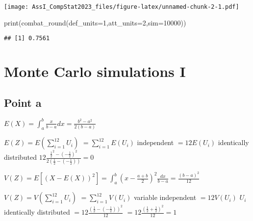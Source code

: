 \documentclass[
]{article}
\newenvironment{Shaded}{\begin{snugshade}}{\end{snugshade}}
\newcommand{\AttributeTok}[1]{\textcolor[rgb]{0.77,0.63,0.00}{#1}}
\newcommand{\DecValTok}[1]{\textcolor[rgb]{0.00,0.00,0.81}{#1}}
\newcommand{\FunctionTok}[1]{\textcolor[rgb]{0.00,0.00,0.00}{#1}}
\newcommand{\NormalTok}[1]{#1}
\begin{document}
\texttt{[image: AssI\_CompStat2023\_files/figure-latex/unnamed-chunk-2-1.pdf]}

\begin{Shaded}
\begin{Highlighting}[]
\FunctionTok{print}\NormalTok{(}\FunctionTok{combat\_round}\NormalTok{(}\AttributeTok{def\_units=}\DecValTok{1}\NormalTok{,}\AttributeTok{att\_units=}\DecValTok{2}\NormalTok{,}\AttributeTok{sim=}\DecValTok{10000}\NormalTok{))}
\end{Highlighting}
\end{Shaded}

\begin{verbatim}
## [1] 0.7561
\end{verbatim}

\hypertarget{monte-carlo-simulations-i}{%
\section{Monte Carlo simulations I}\label{monte-carlo-simulations-i}}

\hypertarget{point-a-1}{%
\subsection{Point a}\label{point-a-1}}

\(E(X)=\int_a^b\frac{x}{b-a}dx=\frac{b^2-a^2}{2(b-a)}\)

\(E(Z)=E(\sum_{i=1}^{12}U_i)\) \(=\sum_{i=1}^{12}E(U_i)\) independent
\(=12E(U_i)\) identically distributed
\(12\frac{\frac{1}{2}^2-(-\frac{1}{2})^2}{2(\frac{1}{2}-(-\frac{1}{2}))}=0\)

\(V(Z)=E[(X-E(X))^2]=\int_a^b(x-\frac{a+b}{2})^2\frac{dx}{b-a}=\frac{(b-a)^2}{12}\)

\(V(Z)=V(\sum_{i=1}^{12}U_i)\) \(=\sum_{i=1}^{12}V(U_i)\) variable
independent \(=12V(U_i)\) \(U_i\) identically distributed
\(=12\frac{(\frac{1}{2}-(-\frac{1}{2}))^2}{12}\)
\(=12\frac{(\frac{1}{2}+\frac{1}{2})^2}{12}=1\)
\end{document}
